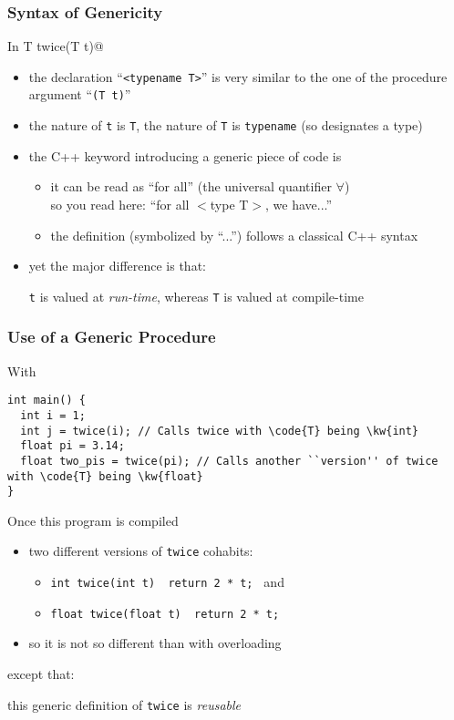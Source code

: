 \documentclass{beamer}
\newcommand{\cpp}{{C++}\xspace}
\newcommand{\kw}[1]{{\color{blue}{\texttt{#1}}}\xspace}
\newcommand{\code}[1]{{\scriptsize{\texttt{#1}}}\xspace}
\begin{document}
\begin{frame}[fragile]
  \frametitle{Syntax of Genericity}

In  T twice(T t)@
%
\begin{itemize}
\item the declaration ``\code{<typename T>}'' is very similar to the
  one of the procedure argument ``\code{(T t)}''
%
\item the nature of \code{t} is \code{T}, the nature of \code{T} is
  \code{typename} (so designates a type)
%
\item the \cpp keyword introducing a generic piece of code is
  \kw{template}
  \begin{itemize}
  \item it can be read as ``for all'' (the universal quantifier $\forall$)\\
    so you read here: ``for all $<$type T$>$, we have...''
  \item the definition (symbolized by ``...'') follows a classical
    \cpp syntax
  \end{itemize}
%
\item yet the major difference is that:
  \begin{center}
    \code{t} is valued at \emph{run-time}, whereas \code{T} is valued at compile-time
  \end{center}
\end{itemize}

\end{frame}


\begin{frame}[fragile]
  \frametitle{Use of a Generic Procedure}

With
\begin{lstlisting}
int main() {
  int i = 1;
  int j = twice(i); // Calls twice with \code{T} being \kw{int}
  float pi = 3.14;
  float two_pis = twice(pi); // Calls another ``version'' of twice with \code{T} being \kw{float}
}
\end{lstlisting}


Once this program is compiled
\begin{itemize}
\item two different versions of \code{twice} cohabits:
  \begin{itemize}
  \item \code{int   twice(int   t) { return 2 * t; }} and
  \item \code{float twice(float t) { return 2 * t; }}
  \end{itemize}
\item so it is not so different than with overloading
\end{itemize}

except that:
\begin{center}
  this generic definition of \code{twice} is \emph{reusable}
\end{center}

\end{frame}
\end{document}
